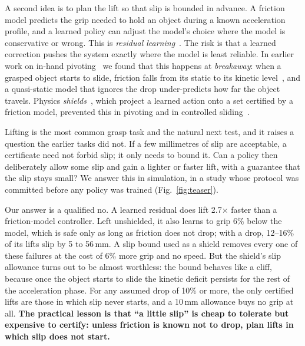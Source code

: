A second idea is to plan the lift so that slip is bounded in advance. A friction model predicts the grip needed to hold an
object during a known acceleration profile, and a learned policy can adjust the model's choice where the model is
conservative or wrong. This is \emph{residual learning}~\cite{johannink2019,silver2018}. The risk is that a learned
correction pushes the system exactly where the model is least reliable. In earlier work on in-hand
pivoting~\cite{aidoo2026b} we found that this happens at \emph{breakaway}: when a grasped object starts to slide, friction
falls from its static to its kinetic level~\cite{rabinowicz1951,armstrong1994}, and a quasi-static model that ignores the
drop under-predicts how far the object travels. Physics \emph{shields}~\cite{alshiekh2018}, which project a learned action
onto a set certified by a friction model, prevented this in pivoting and in controlled sliding~\cite{aidoo2026c}.

Lifting is the most common grasp task and the natural next test, and it raises a question the earlier tasks did not. If a
few millimetres of slip are acceptable, a certificate need not forbid slip; it only needs to bound it. Can a policy then
deliberately allow some slip and gain a lighter or faster lift, with a guarantee that the slip stays small? We answer this
in simulation, in a study whose protocol was committed before any policy was trained (Fig.~\ref{fig:teaser}).

Our answer is a qualified no. A learned residual does lift 2.7$\times$ faster than a friction-model controller. Left
unshielded, it also learns to grip 6\% below the model, which is safe only as long as friction does not drop; with a drop,
12--16\% of its lifts slip by 5 to 56\,mm. A slip bound used as a shield removes every one of these failures at the cost of
6\% more grip and no speed. But the shield's slip allowance turns out to be almost worthless: the bound behaves like a
cliff, because once the object starts to slide the kinetic deficit persists for the rest of the acceleration phase. For any
assumed drop of 10\% or more, the only certified lifts are those in which slip never starts, and a 10\,mm allowance buys no
grip at all. \textbf{The practical lesson is that ``a little slip'' is cheap to tolerate but expensive to certify: unless
friction is known not to drop, plan lifts in which slip does not start.}

